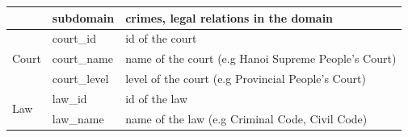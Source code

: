 \documentclass[conference]{IEEEtran}
\begin{document}
\begin{table}[ht]
\begin{tabular}{|p{1cm}|p{2cm}|p{4.5cm}|}
                                      & subdomain                                & crimes, legal relations in the domain                          \\ \hline
\multirow{3}{*}{Court}                & court\_id                                & id of the court                                                \\ \cline{2-3} 
                                      & court\_name                              & name of the court (e.g Hanoi Supreme People's Court)           \\ \cline{2-3} 
                                      & court\_level                             & level of the court (e.g Provincial People's Court)             \\ \hline
\multirow{2}{*}{Law}                  & law\_id                                  & id of the law                                                  \\ \cline{2-3} 
                                      & law\_name                                & name of the law (e.g Criminal Code, Civil Code)                \\ \hline
\end{tabular}
\end{table}
\end{document}
